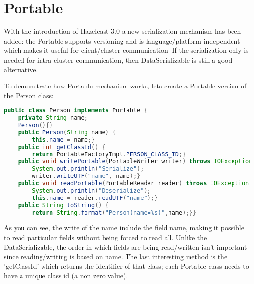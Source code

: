\section{Portable}
With the introduction of Hazelcast 3.0 a new serialization mechanism has been added: the Portable supports versioning and is language/platform independent which makes it useful for client/cluster communication. If the serialization only is needed for intra cluster communication, then DataSerializable is still a good alternative.

To demonstrate how Portable mechanism works, lets create a Portable version of the Person class:
\begin{lstlisting}[language=java]
public class Person implements Portable {
    private String name;
    Person(){}
    public Person(String name) {
        this.name = name;}
    public int getClassId() {
        return PortableFactoryImpl.PERSON_CLASS_ID;}
    public void writePortable(PortableWriter writer) throws IOException {
        System.out.println("Serialize");
        writer.writeUTF("name", name);}
    public void readPortable(PortableReader reader) throws IOException {
        System.out.println("Deserialize");
        this.name = reader.readUTF("name");}
    public String toString() {
        return String.format("Person(name=%s)",name);}}
\end{lstlisting}
As you can see, the write of the name include the field name, making it possible to read particular fields without being forced to read all.  Unlike the DataSerializable, the order in which fields are being read/written isn't important since reading/writing is based  on name. The last interesting method is the 'getClassId' which returns the identifier of that class; each Portable class needs to have a unique class id (a non zero value).

